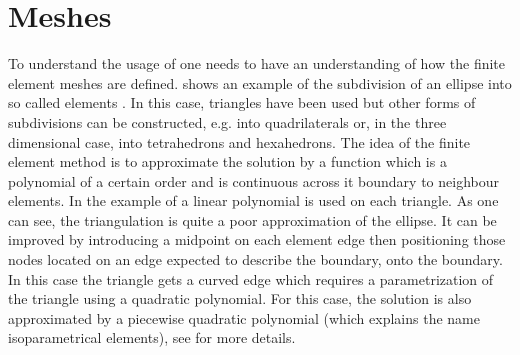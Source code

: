 \section{Meshes}
To understand the usage of \finley one needs to have an understanding of how the finite element meshes
 are defined.  shows an example of the
subdivision of an ellipse into so called elements  . 
In this case, triangles have been used but other forms of subdivisions
can be constructed, e.g. into quadrilaterals or, in the three dimensional case, into tetrahedrons
and hexahedrons. The idea of the finite element method is to approximate the solution by a function
which is a polynomial of a certain order and is continuous across it boundary to neighbour elements.
In the example of  a linear polynomial is used on each triangle. As one can see, the triangulation
is quite a poor approximation of the ellipse. It can be improved by introducing a midpoint on each element edge then
positioning those nodes located on an edge expected to describe the boundary, onto the boundary.
In this case the triangle gets a curved edge which requires a parametrization of the triangle using a 
quadratic polynomial. For this case, the solution is also approximated by a piecewise quadratic polynomial
(which explains the name isoparametrical elements), see  for more details.   

